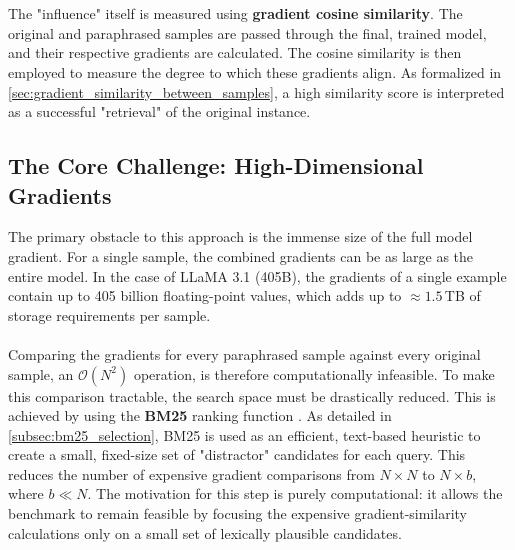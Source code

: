\\\\
The "influence" itself is measured using \textbf{gradient cosine similarity}. The original and paraphrased samples are passed through the final, trained model, and their respective gradients are calculated. The cosine similarity is then employed to measure the degree to which these gradients align. As formalized in \autoref{sec:gradient_similarity_between_samples}, a high similarity score is interpreted as a successful "retrieval" of the original instance.

\subsection{The Core Challenge: High-Dimensional Gradients}\label{subsec:core_challenge}
The primary obstacle to this approach is the immense size of the full model gradient. For a single sample, the combined gradients can be as large as the entire model. In the case of LLaMA 3.1 (405B), the gradients of a single example contain up to 405 billion floating-point values, which adds up to $\approx 1.5$\,TB of storage requirements per sample.
\\\\
Comparing the gradients for every paraphrased sample against every original sample, an $\mathcal{O}(N^2)$ operation, is therefore computationally infeasible. To make this comparison tractable, the search space must be drastically reduced. This is achieved by using the \textbf{BM25} ranking function \cite{DBLP:journals/ftir/RobertsonZ09}. As detailed in \autoref{subsec:bm25_selection}, BM25 is used as an efficient, text-based heuristic to create a small, fixed-size set of "distractor" candidates for each query. This reduces the number of expensive gradient comparisons from $N \times N$ to $N \times b$, where $b \ll N$. The motivation for this step is purely computational: it allows the benchmark to remain feasible by focusing the expensive gradient-similarity calculations only on a small set of lexically plausible candidates.

